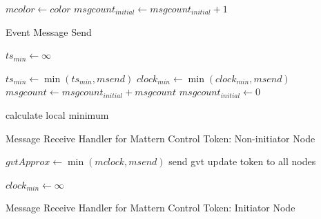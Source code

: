 \documentclass[11pt]{book}
\begin{document}
\begin{algorithm}
\DontPrintSemicolon
\SetAlgoVlined

    $mcolor \gets color$\;
     {
      $msgcount_{initial} \gets msgcount_{initial} + 1$\;
    }

\caption{Event Message Send}
\end{algorithm}

\begin{algorithm}
\DontPrintSemicolon
\SetAlgoVlined
{}

   {
    $ts_{min} \gets \infty$\;
     
  }

  $ts_{min} \gets \min{(ts_{min}, msend)}$\;
  $clock_{min} \gets \min{(clock_{min}, msend)}$
  $msgcount \gets msgcount_{initial} + msgcount$\;
  $msgcount_{initial} \gets 0$\;

  calculate local minimum\;

  \;

\caption{Message Receive Handler for Mattern Control Token: Non-initiator Node}
\end{algorithm}

\begin{algorithm}
\DontPrintSemicolon
\SetAlgoVlined
{}

   {
    $gvtApprox \gets \min{(mclock, msend)}$\;
    send gvt update token to all nodes\;

     

    $clock_{min} \gets \infty$\;
  } 

\caption{Message Receive Handler for Mattern Control Token: Initiator Node}
\end{algorithm}

\end{document}
